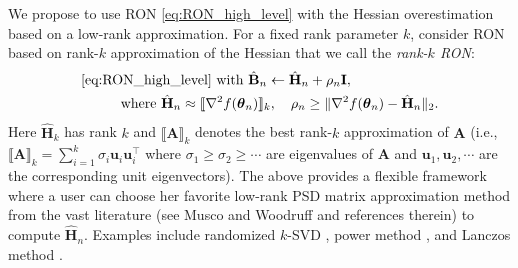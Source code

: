 \documentclass[11pt]{amsart}
\theoremstyle{plain}
\theoremstyle{definition}
\theoremstyle{remark}
\def\H{\mathbf{H}}
\def\I{\mathbf{I}}
\def\u{\mathbf{u}}
\def\A{\mathbf{A}}
\def\B{\mathbf{B}}
\def\param{\boldsymbol{\theta}}
\def\I{\mathbf{I}}
\begin{document}
We propose to use RON \eqref{eq:RON_high_level} with the Hessian overestimation based on a low-rank approximation. For a fixed rank parameter $k$, consider RON based on rank-$k$ approximation of the Hessian that we call the \textit{rank-$k$ RON}:  
\begin{align}\label{eq:RPC_hessian_approximation}
 & \textup{\eqref{eq:RON_high_level} with }  \hat{\B}_{n}  \leftarrow \hat{\H}_{n} + \rho_{n} \I, %
\\
&\hspace{1cm} \textup{where $\hat{\H}_{n}$}  \approx \llbracket \nabla^{2} f(\param_{n})  \rrbracket_{k}, %
\quad \rho_{n} \ge \| \nabla^{2}f(\param_{n}) - \hat{\H}_{n} \|_{2}. \nonumber 
\end{align}
Here $\hat{\H}_{k}$ has rank $k$ and  $\llbracket \A \rrbracket_k$ denotes the best  rank-$k$ approximation of $\A$ (i.e., $\llbracket \A \rrbracket_k=\sum_{i=1}^{k} \sigma_{i}\u_{i} \u_{i}^{\top}$ where $\sigma_{1}\ge\sigma_{2}\ge\cdots$ are eigenvalues of $\A$ and $\u_{1},\u_{2},\cdots$ are the corresponding unit eigenvectors). The above provides a flexible framework where a user can choose her favorite low-rank PSD matrix approximation method from the vast literature (see Musco and Woodruff \cite{musco2017sublinear} and references therein) to compute $\hat{\H}_{n}$. Examples include randomized $k$-SVD \cite{halko2011finding, tzeng2022improved}, power method \cite{golub2013matrix}, and Lanczos method \cite{lanczos1950iteration}. 
\end{document}
